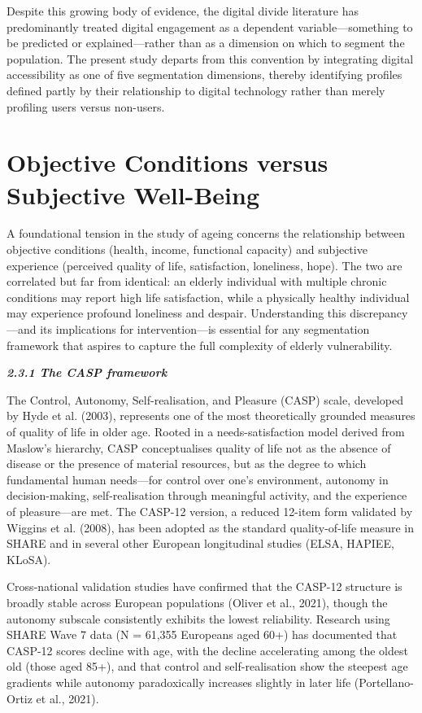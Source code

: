 Despite this growing body of evidence, the digital divide literature has predominantly treated digital engagement as a dependent variable---something to be predicted or explained---rather than as a dimension on which to segment the population. The present study departs from this convention by integrating digital accessibility as one of five segmentation dimensions, thereby identifying profiles defined partly by their relationship to digital technology rather than merely profiling users versus non-users.

\section{Objective Conditions versus Subjective Well-Being}
A foundational tension in the study of ageing concerns the relationship between objective conditions (health, income, functional capacity) and subjective experience (perceived quality of life, satisfaction, loneliness, hope). The two are correlated but far from identical: an elderly individual with multiple chronic conditions may report high life satisfaction, while a physically healthy individual may experience profound loneliness and despair. Understanding this discrepancy---and its implications for intervention---is essential for any segmentation framework that aspires to capture the full complexity of elderly vulnerability.

\emph{\textbf{2.3.1 The CASP framework}}

The Control, Autonomy, Self-realisation, and Pleasure (CASP) scale, developed by Hyde et al. (2003), represents one of the most theoretically grounded measures of quality of life in older age. Rooted in a needs-satisfaction model derived from Maslow's hierarchy, CASP conceptualises quality of life not as the absence of disease or the presence of material resources, but as the degree to which fundamental human needs---for control over one's environment, autonomy in decision-making, self-realisation through meaningful activity, and the experience of pleasure---are met. The CASP-12 version, a reduced 12-item form validated by Wiggins et al. (2008), has been adopted as the standard quality-of-life measure in SHARE and in several other European longitudinal studies (ELSA, HAPIEE, KLoSA).

Cross-national validation studies have confirmed that the CASP-12 structure is broadly stable across European populations (Oliver et al., 2021), though the autonomy subscale consistently exhibits the lowest reliability. Research using SHARE Wave 7 data (N = 61,355 Europeans aged 60+) has documented that CASP-12 scores decline with age, with the decline accelerating among the oldest old (those aged 85+), and that control and self-realisation show the steepest age gradients while autonomy paradoxically increases slightly in later life (Portellano-Ortiz et al., 2021).

